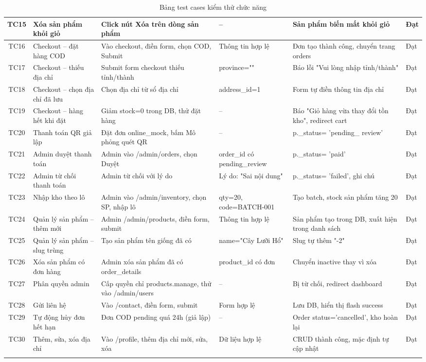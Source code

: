 \documentclass[a4paper]{article}
\begin{document}
\begin{longtable}{|c|p{2.6cm}|p{3.3cm}|p{2.3cm}|p{3cm}|p{1.6cm}|}
\hline
TC15 & Xóa sản phẩm khỏi giỏ & Click nút Xóa trên dòng sản phẩm & -- & Sản phẩm biến mất khỏi giỏ & Đạt \\
\hline
TC16 & Checkout -- đặt hàng COD & Vào checkout, điền form, chọn COD, Submit & Thông tin hợp lệ & Đơn tạo thành công, chuyển trang orders & Đạt \\
\hline
TC17 & Checkout -- thiếu địa chỉ & Submit form checkout thiếu tỉnh/thành & province="" & Báo lỗi "Vui lòng nhập tỉnh/thành" & Đạt \\
\hline
TC18 & Checkout -- chọn địa chỉ đã lưu & Chọn địa chỉ từ sổ địa chỉ & address\_id=1 & Form tự điền thông tin địa chỉ & Đạt \\
\hline
TC19 & Checkout -- hàng hết khi đặt & Giảm stock=0 trong DB, thử đặt hàng & -- & Báo "Giỏ hàng vừa thay đổi tồn kho", redirect cart & Đạt \\
\hline
TC20 & Thanh toán QR giả lập & Đặt đơn online\_mock, bấm Mô phỏng quét QR & -- & p.\_status= 'pending\_ review' & Đạt \\
\hline
TC21 & Admin duyệt thanh toán & Admin vào /admin/orders, chọn Duyệt & order\_id có pending\_review & p.\_status= 'paid' & Đạt \\
\hline
TC22 & Admin từ chối thanh toán & Admin từ chối với lý do & Lý do: "Sai nội dung" & p.\_status= 'failed', ghi chú & Đạt \\
\hline
TC23 & Nhập kho theo lô & Admin vào /admin/inventory, chọn SP, nhập lô & qty=20, code=BATCH-001 & Tạo batch, stock sản phẩm tăng 20 & Đạt \\
\hline
TC24 & Quản lý sản phẩm -- thêm mới & Admin /admin/products, điền form, submit & Thông tin hợp lệ & Sản phẩm tạo trong DB, xuất hiện trong danh sách & Đạt \\
\hline
TC25 & Quản lý sản phẩm -- slug trùng & Tạo sản phẩm tên giống đã có & name="Cây Lưỡi Hổ" & Slug tự thêm "-2" & Đạt \\
\hline
TC26 & Xóa sản phẩm có đơn hàng & Admin xóa sản phẩm đã có order\_details & product\_id có đơn & Chuyển inactive thay vì xóa & Đạt \\
\hline
TC27 & Phân quyền admin & Cấp quyền chỉ products.manage, thử vào /admin/users & -- & Bị từ chối, redirect dashboard & Đạt \\
\hline
TC28 & Gửi liên hệ & Vào /contact, điền form, submit & Form hợp lệ & Lưu DB, hiển thị flash success & Đạt \\
\hline
TC29 & Tự động hủy đơn hết hạn & Đơn COD pending quá 24h (giả lập) & -- & Order status='cancelled', kho hoàn lại & Đạt \\
\hline
TC30 & Thêm, sửa, xóa địa chỉ & Vào /profile, thêm địa chỉ mới, sửa, xóa & Dữ liệu hợp lệ & CRUD thành công, mặc định tự cập nhật & Đạt \\
\hline
\caption{Bảng test cases kiểm thử chức năng}
\end{longtable}
\end{document}
